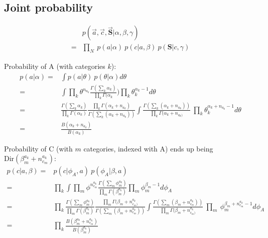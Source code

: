 \documentclass[../main.tex]{subfiles}
\begin{document}
\subsection{Joint probability}
\begin{equation}
\begin{split}
&p(\vec{a}, \vec{c}, \vec{\mathbf{S}}|\alpha, \beta,\gamma)\\
=&\prod_{N}\ p(a|\alpha)\ p(c|a,\beta)\ p(\mathbf{S}|c,\gamma)
\end{split}
\end{equation}

Probability of A (with categories $k$):
\begin{equation}
\begin{split}
p(a| \alpha) 
=& \int p(a|\theta)\ p(\theta|\alpha) d\theta\\
=& \int \prod_{k}\theta^{n_{a_{k}}}%
\frac{\Gamma(\sum_{k} \alpha_{k})}{\prod_{k}\Gamma(\alpha_{k}})\prod_{k} \theta_{k}^{\alpha_{k}-1} %
d\theta\\
=&
\frac{\Gamma(\sum_{k} \alpha_{k})}{\prod_{k}\Gamma(\alpha_{k})} %
\frac{\prod_{k}\Gamma(\alpha_{k}+n_{a_{k}})}{\Gamma(\sum_{k}(\alpha_{k}+n_{a_{k}}))}%
\int
\frac{\Gamma(\sum_{k}(\alpha_{k}+n_{a_{k}}))}{\prod_{k}\Gamma(\alpha_{k}+n_{a_{k})}}\ \prod_{k}%
\theta_{k}^{\alpha_{k}+n_{a_{k}}-1}
d\theta\\
=& \frac{B(\alpha_{k}+n_{a_{k}})}{B(\alpha_{k})}
\end{split}
\end{equation}

Probability of C (with $m$ categories, indexed with A) ends up being $\mbox{Dir}(\beta^{a_{k}}_{m}+n^{a_{k}}_{c_{m}})$:
\begin{equation}
\begin{split}
p(c| a, \beta) 
=& p(c|\phi_{A},a)\ p(\phi_{A}|\beta, a)\\
=& \prod_{k} \int
\prod_{m}\phi^{n^{a_{k}}_{c_{m}}}%
\frac{\Gamma(\sum_{m} \phi^{a_{k}}_{m})}{\prod_{m}\Gamma(\beta^{a_{k}}_{m})} 
\prod_{m} \phi_{m}^{\beta_{m}-1}%
d\phi_{A}
\\
=& \prod_{k}
\frac{\Gamma(\sum_{m} \phi^{a_{k}}_{m})}{\prod_{m}\Gamma(\beta^{a_{k}}_{m})} 
\frac{\prod_{m}\Gamma(\beta_{m}+n^{a_{k}}_{c_{m})}}{\Gamma(\sum_{m}(\beta_{m}+n^{a_{k}}_{c_{m}}))}
\int
\frac{\Gamma(\sum_{m}(\beta_{m}+n^{a_{k}}_{c_{m}}))}{\prod_{m}\Gamma(\beta_{m}+n^{a_{k}}_{c_{m})}}\ \prod_{m}\ \phi_{m}^{\beta_{m}+n^{a_{k}}_{c_{m}}-1} %
d\phi_{A}\\
=&\prod_{k} \frac{B(\beta_{m}^{a_{k}}+n_{c_{m}}^{a_{k}})}{B(\beta_{m}^{a_{k}})} 
\end{split}
\end{equation}
\end{document}
